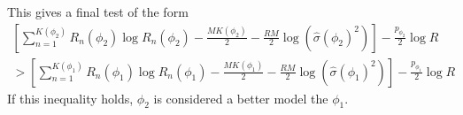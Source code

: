 \documentclass[letterpaper]{article}
\begin{document}
This gives a final test of the form
\begin{multline}
  \label{eq:18}
  \left[ \sum_{n=1}^{K(\phi_2)} R_n(\phi_2) \log R_n(\phi_2) - \frac{M K(\phi_2)}{2} - \frac{RM}{2} \log \left( \hat{\sigma}(\phi_2)^2 \right) \right] - \frac{p_{\phi_2}}{2} \log R \\
   > \left[ \sum_{n=1}^{K(\phi_1)} R_n(\phi_1) \log R_n(\phi_1) - \frac{M K(\phi_1)}{2} - \frac{RM}{2} \log \left( \hat{\sigma}(\phi_1)^2 \right) \right] - \frac{p_{\phi_1}}{2} \log R
\end{multline}
%
If this inequality holds, $\phi_2$ is considered a better model the $\phi_1$.

{}

\end{document}
